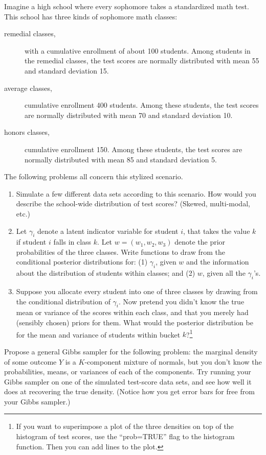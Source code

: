 \documentclass{mynotes}
\begin{document}
Imagine a high school where every sophomore takes a standardized math test.  This school has three kinds of sophomore math classes:
\begin{description}
\item[remedial classes,] with a cumulative enrollment of about 100 students.  Among students in the remedial classes, the test scores are normally distributed with mean 55 and standard deviation 15.
\item[average classes,] cumulative enrollment 400 students.  Among these students, the test scores are normally distributed with mean 70 and standard deviation 10.
\item[honors classes,] cumulative enrollment 150. Among these students, the test scores are normally distributed with mean 85 and standard deviation 5.
\end{description}

The following problems all concern this stylized scenario.
\begin{enumerate}
\item Simulate a few different data sets according to this scenario.  How would you describe the school-wide distribution of test scores? (Skewed, multi-modal, etc.)
\item Let $\gamma_i$ denote a latent indicator variable for student $i$, that takes the value $k$ if student $i$ falls in class $k$.  Let $w = (w_1, w_2, w_3)$ denote the prior probabilities of the three classes.  Write functions to draw from the conditional posterior distributions for: (1) $\gamma_i$, given $w$ and the information about the distribution of students within classes; and (2) $w$, given all the $\gamma_i$'s.
\item Suppose you allocate every student into one of three classes by drawing from the conditional distribution of $\gamma_i$.  Now pretend you didn't know the true mean or variance of the scores within each class, and that you merely had (sensibly chosen) priors for them.  What would the posterior distribution be for the mean and variance of students within bucket $k$?\footnote[][-3pc]{If you want to superimpose a plot of the three densities on top of the histogram of test scores, use the ``prob=TRUE'' flag to the histogram function.  Then you can add lines to the plot.}
\end{enumerate}
Propose a general Gibbs sampler for the following problem: the marginal density of some outcome $Y$ is a $K$-component mixture of normals, but you don't know the probabilities, means, or variances of each of the components.  Try running your Gibbs sampler on one of the simulated test-score data sets, and see how well it does at recovering the true density.  (Notice how you get error bars for free from your Gibbs sampler.) 
\end{document}
